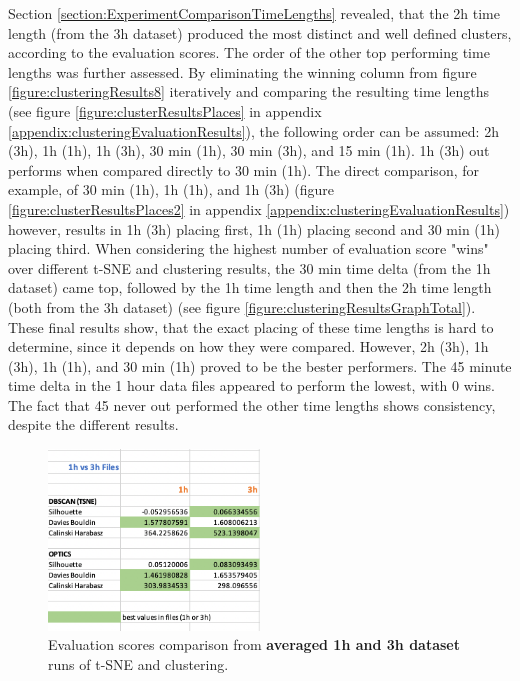 Section \ref{section:ExperimentComparisonTimeLengths} revealed, that the 2h time length (from the 3h dataset) produced the most distinct and well defined clusters, according to the evaluation scores. The order of the other top performing time lengths was further assessed. By eliminating the winning column from figure \ref{figure:clusteringResults8} iteratively and comparing the resulting time lengths (see figure \ref{figure:clusterResultsPlaces} in appendix \ref{appendix:clusteringEvaluationResults}), the following order can be assumed: 2h (3h), 1h (1h), 1h (3h), 30 min (1h), 30 min (3h), and 15 min (1h). 1h (3h) out performs when compared directly to 30 min (1h). The direct comparison, for example, of 30 min (1h), 1h (1h), and 1h (3h) (figure \ref{figure:clusterResultsPlaces2} in appendix \ref{appendix:clusteringEvaluationResults}) however, results in 1h (3h) placing first, 1h (1h) placing second and 30 min (1h) placing third. When considering the highest number of evaluation score "wins" over different t-SNE and clustering results, the 30 min time delta (from the 1h dataset) came top, followed by the 1h time length and then the 2h time length (both from the 3h dataset) (see figure \ref{figure:clusteringResultsGraphTotal}). These final results show, that the exact placing of these time lengths is hard to determine, since it depends on how they were compared. However, 2h (3h), 1h (3h), 1h (1h), and 30 min (1h) proved to be the bester performers.
The 45 minute time delta in the 1 hour data files appeared to perform the lowest, with 0 wins. The fact that 45 never out performed the other time lengths shows consistency, despite the different results.
 


\begin{figure}
  \centering
  \includegraphics[width=0.5\textwidth]{./images/clusteringResults/clusteringResults7.png}
  \caption{Evaluation scores comparison from \textbf{averaged 1h and 3h dataset} runs of t-SNE and clustering.}
  \label{figure:clusteringResults7}
\end{figure}


